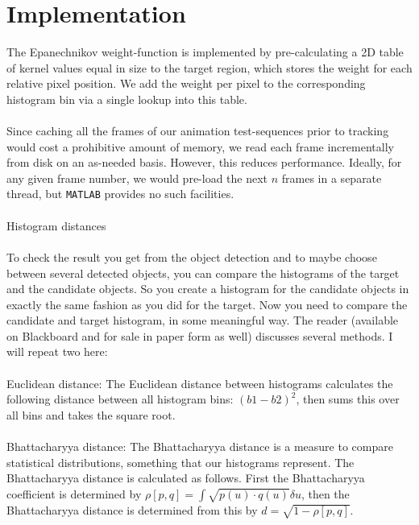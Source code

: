 \documentclass[a4paper,11pt]{article}
\begin{document}
	\section*{Implementation}
		The Epanechnikov weight-function is implemented by pre-calculating a 2D
		table of kernel values equal in size to the target region, which stores
		the weight for each relative pixel position. We add the weight per pixel
		to the corresponding histogram bin via a single lookup into this table.
		\\ \\
		Since caching all the frames of our animation test-sequences prior to
		tracking would cost a prohibitive amount of memory, we read each frame
		incrementally from disk on an as-needed basis. However, this reduces
		performance. Ideally, for any given frame number, we would pre-load the
		next $n$ frames in a separate thread, but \verb|MATLAB| provides no such
		facilities.
		\\ \\
		Histogram distances
		\\ \\
		To check the result you get from the object detection and to maybe choose
		between several detected objects, you can compare the histograms of the
		target and the candidate objects. So you create a histogram for the candidate
		objects in exactly the same fashion as you did for the target. Now you need
		to compare the candidate and target histogram, in some meaningful way. The
		reader (available on Blackboard and for sale in paper form as well) discusses
		several methods. I will repeat two here:
		\\ \\
		Euclidean distance: The Euclidean distance between histograms calculates the
		following distance between all histogram bins: $(b1 - b2)^2$, then sums this
		over all bins and takes the square root.
		\\ \\
		Bhattacharyya distance: The Bhattacharyya distance is a measure to compare statistical
		distributions, something that our histograms represent. The Bhattacharyya distance is
		calculated as follows. First the Bhattacharyya coefficient is determined by
		$\rho[p, q] = \int \sqrt{p(u) \cdot q(u) } \delta u$, then the Bhattacharyya
		distance is determined from this by $d = \sqrt{1 - \rho[p, q]}$.
\end{document}

